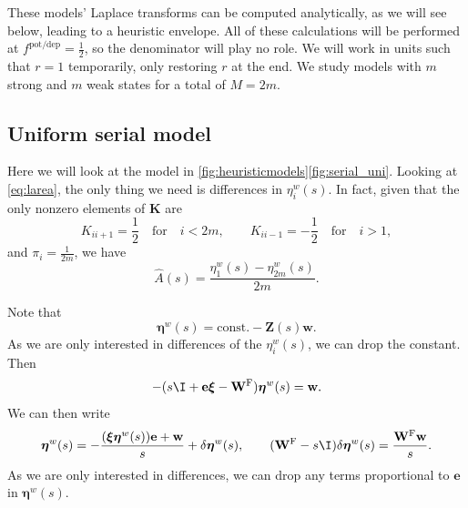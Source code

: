 \documentclass[12pt]{article}
\newcommand{\onev}{\mathbf{e}}
\newcommand{\eqm}{\pi}
\newcommand{\fundm}{Z}
\newcommand{\fund}{\mathbf{\fundm}}
\newcommand{\arowm}{\xi}
\newcommand{\arow}{\boldsymbol{\arowm}}
\newcommand{\etwm}{\eta^w}
\newcommand{\etw}{\boldsymbol{\eta}^w}
\newcommand{\wm}{w}
\newcommand{\w}{\mathbf{\wm}}
\newcommand{\Wm}{W}
\newcommand{\W}{\mathbf{\Wm}}
\newcommand{\encm}{K}
\newcommand{\enc}{\mathbf{\encm}}
\newcommand{\frg}{\W^{\mathrm{F}}}
\newcommand{\potdep}{^{\text{pot/dep}}}
\begin{document}
These models' Laplace transforms can be computed analytically, as we will see below, leading to a heuristic envelope.
All of these calculations will be performed at \(f\potdep=\frac{1}{2}\), so the denominator will play no role.
We will work in units such that \(r=1\) temporarily, only restoring \(r\) at the end.
We study models with \(m\) strong and \(m\) weak states for a total of  \(M = 2 m\).


\subsection{Uniform serial model}\label{sec:serial_uniform}

Here we will look at the model in \cref{fig:heuristicmodels}\ref{fig:serial_uni}.
Looking at \eqref{eq:larea}, the only thing we need is differences in \(\etwm_i(s)\).
In fact, given that the only nonzero elements of \(\enc\) are
%
\begin{equation}\label{eq:unienc}
  \encm_{ii+1}=\frac{1}{2} \quad\text{for}\quad i<2m,
  \qquad
  \encm_{ii-1}=-\frac{1}{2} \quad\text{for}\quad i>1,
\end{equation}
%
and \(\eqm_i = \frac{1}{2m}\), we have
%
\begin{equation}\label{eq:uniareaeta}
  \hat{A}(s) = \frac{\etwm_1(s) - \etwm_{2m}(s)}{2m}.
\end{equation}
%

Note that
%
\begin{equation}\label{eq:etafund}
  \etw(s) = \text{const.} - \fund(s)\w.
\end{equation}
%
As we are only interested in differences of the \(\etwm_i(s)\), we can drop the constant.
Then
%
\begin{equation}\label{eq:etarecur}
  -(s\I + \onev \arow - \frg)\etw(s) = \w.
\end{equation}
%
We can then write
%
\begin{equation}\label{eq:detarecur}
  \etw(s) = -\frac{(\arow \etw(s)) \onev + \w}{s} + \delta \etw(s),
  \qquad
  (\frg - s\I) \delta \etw(s) = \frac{\frg \w}{s}.
\end{equation}
%
As we are only interested in differences, we can drop any terms proportional to \(\onev\) in \(\etw(s)\).
\end{document}
